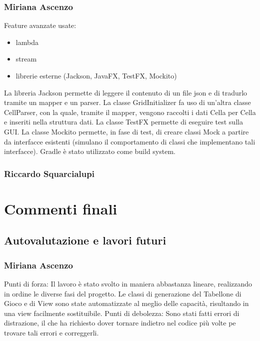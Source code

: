 \documentclass[a4paper,12pt]{report}
\begin{document}
	\subsection{Miriana Ascenzo}

	Feature avanzate usate:
	\begin{itemize}
		\item lambda
		\item stream
		\item librerie esterne (Jackson, JavaFX, TestFX, Mockito)
	\end {itemize}
	La libreria Jackson permette di leggere il contenuto di un file json e di tradurlo tramite un mapper e un parser.
	La classe GridInitializer fa uso di un’altra classe CellParser, con la quale, tramite il mapper, vengono raccolti i dati Cella per Cella e inseriti nella struttura dati.
	La classe TestFX permette di eseguire test sulla GUI.
	La classe Mockito permette, in fase di test, di creare classi Mock a partire da interfacce esistenti (simulano il comportamento di classi che implementano tali interfacce).
    Gradle è stato utilizzato come build system.

	\subsection{Riccardo Squarcialupi}

	\chapter{Commenti finali}

    \section{Autovalutazione e lavori futuri}

    \subsection{Miriana Ascenzo}
    Punti di forza:
    Il lavoro è stato svolto in maniera abbastanza lineare, realizzando in ordine le diverse fasi del progetto.
    Le classi di generazione del Tabellone di Gioco e di View sono state automatizzate al meglio delle capacità, risultando in una view facilmente sostituibile.\newline
    Punti di debolezza:
    Sono stati fatti errori di distrazione, il che ha richiesto dover tornare indietro nel codice più volte pe trovare tali errori e correggerli.
\end{document}

